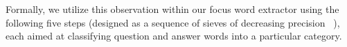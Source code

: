 
Formally, we utilize this observation within our focus word extractor using the following five steps (designed as a sequence of sieves of decreasing precision ~\citep{Lee:13}), each aimed at classifying question and answer words into a particular category.   

